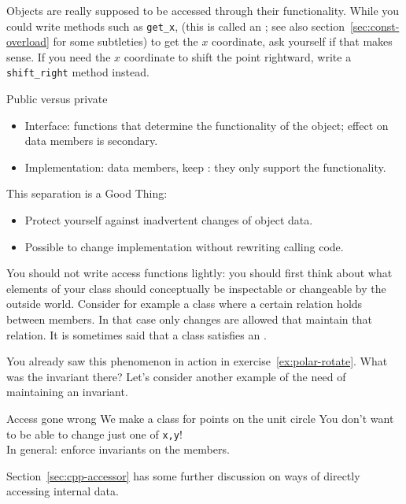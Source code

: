 Objects are really supposed to be accessed through their functionality.
While you could write methods such as \lstinline+get_x+,
(this is called an ;
see also section~\ref{sec:const-overload} for some subtleties)
to get the $x$ coordinate,
ask yourself if that makes sense.
If you need the $x$ coordinate to shift the point rightward,
write a \lstinline+shift_right+ method instead.

\begin{block}{Public versus private}
  \label{sl:interfaceimpl}
  \begin{itemize}
  \item Interface:  functions that determine the
    functionality of the object; effect on data members is secondary.
  \item Implementation: data members, keep : they
    only support the functionality.
  \end{itemize}
  This separation is a Good Thing:
  \begin{itemize}
  \item Protect yourself against inadvertent changes of object data.
  \item Possible to change implementation without rewriting calling code.
  \end{itemize}
\end{block}

You should not write access functions lightly: you should first think
about what elements of your class should conceptually be inspectable
or changeable by the outside world.  Consider for example a class
where a certain relation holds between members. In that case only
changes are allowed that maintain that relation.
It is sometimes said that a class satisfies an .

You already saw this phenomenon in action in exercise~\ref{ex:polar-rotate}.
What was the invariant there?
Let's consider another example of the need of maintaining an invariant.

\begin{block}{Access gone wrong}
  \label{sl:privatenogoo}
  We make a class for points on the unit circle
  \lstset{style=snippetcode}
  You don't want to be able to change just one of \lstinline{x,y}!\\
  In general: enforce invariants on the members.
\end{block}

Section~\ref{sec:cpp-accessor} has some further discussion on ways
of directly accessing internal data.

